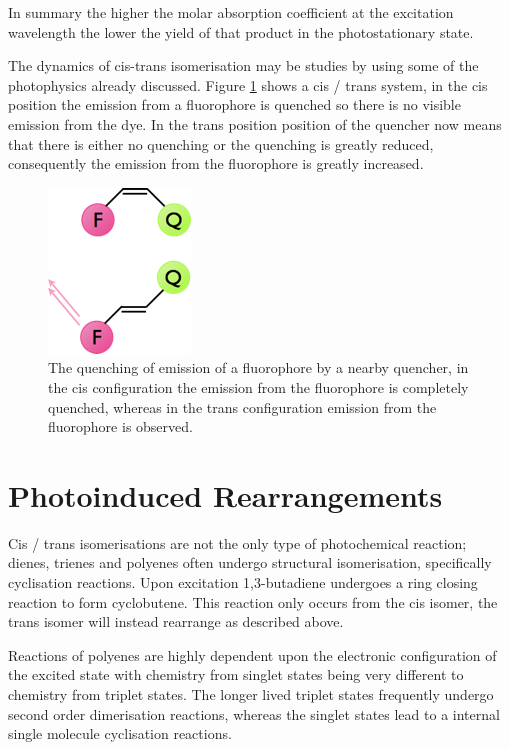 \documentclass[
]{book}
\begin{document}
In summary the higher the molar absorption coefficient at the excitation wavelength the lower the yield of that product in the photostationary state.

The dynamics of cis-trans isomerisation may be studies by using some of the photophysics already discussed. Figure \ref{fig:cisquench} shows a cis / trans system, in the cis position the emission from a fluorophore is quenched so there is no visible emission from the dye. In the trans position position of the quencher now means that there is either no quenching or the quenching is greatly reduced, consequently the emission from the fluorophore is greatly increased.

\begin{figure}

{\centering \includegraphics[width=0.2\linewidth]{images/cisquench} 

}

\caption{The quenching of emission of a fluorophore by a nearby quencher, in the cis configuration the emission from the fluorophore is completely quenched, whereas in the trans configuration emission from the fluorophore is observed.}\label{fig:cisquench}
\end{figure}

\hypertarget{sec:photoinducedrearrange}{%
\section{Photoinduced Rearrangements}\label{sec:photoinducedrearrange}}

Cis / trans isomerisations are not the only type of photochemical reaction; dienes, trienes and polyenes often undergo structural isomerisation, specifically cyclisation reactions. Upon excitation 1,3-butadiene undergoes a ring closing reaction to form cyclobutene. This reaction only occurs from the cis isomer, the trans isomer will instead rearrange as described above.

Reactions of polyenes are highly dependent upon the electronic configuration of the excited state with chemistry from singlet states being very different to chemistry from triplet states. The longer lived triplet states frequently undergo second order dimerisation reactions, whereas the singlet states lead to a internal single molecule cyclisation reactions.
\end{document}
